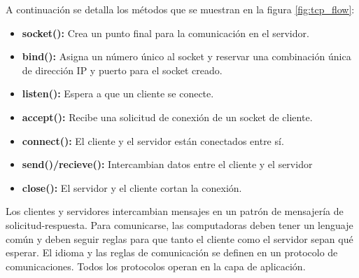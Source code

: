 A continuación se detalla los métodos que se muestran en la figura \ref{fig:tcp_flow}:
\begin{itemize}
    \item \textbf{socket():} Crea un punto final para la comunicación en el servidor.
    \item \textbf{bind():} Asigna un número único al socket y reservar una combinación única de dirección IP y puerto para el socket creado.
    \item \textbf{listen():} Espera a que un cliente se conecte.
    \item \textbf{accept():} Recibe una solicitud de conexión de un socket de cliente.
    \item \textbf{connect():} El cliente y el servidor están conectados entre sí.
    \item \textbf{send()/recieve():} Intercambian datos entre el cliente y el servidor
    \item \textbf{close():} El servidor y el cliente cortan la conexión.
\end{itemize}




Los clientes y servidores intercambian mensajes en un patrón de mensajería de solicitud-respuesta. Para comunicarse, las computadoras deben tener un lenguaje común y deben seguir reglas para que tanto el cliente como el servidor sepan qué esperar. El idioma y las reglas de comunicación se definen en un protocolo de comunicaciones. Todos los protocolos operan en la capa de aplicación.\\

